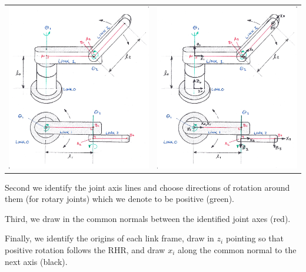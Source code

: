 \begin{ExampleCont}
\begin{tabular}{cc}
\includegraphics[width=3.25in]{figs03/00715_D.eps}
&
\includegraphics[width=3.25in]{figs03/00715_E.eps}
\end{tabular}


Second we identify the joint axis lines and choose directions of rotation around them (for rotary joints) which we denote to be positive (green).

Third, we draw in the common normals between the identified joint axes (red).

Finally, we identify the origins of each link frame, draw in $z_i$ pointing so that positive rotation follows the RHR, and draw $x_i$ along the common normal to the next axis (black).


\end{ExampleCont}
